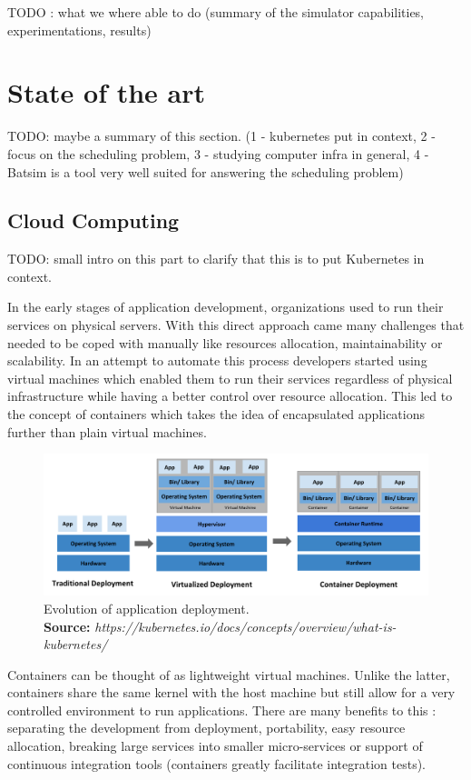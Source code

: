 \documentclass[12pt, a4paper]{memoir}
\newcommand*{\captionsource}[2]{%
    \caption[{#1}]{%
        #1%
        \\\hspace{\linewidth}%
	\textbf{Source:} \textit{#2}%
    }%
}
\begin{document}
TODO : what we where able to do (summary of the simulator capabilities,
experimentations, results)

\chapter{State of the art}

TODO: maybe a summary of this section. (1 - kubernetes put in context, 2 -
focus on the scheduling problem, 3 - studying computer infra in general, 4 -
Batsim is a tool very well suited for answering the scheduling problem)

\section{Cloud Computing}

TODO: small intro on this part to clarify that this is to put Kubernetes in context.

In the early stages of application development, organizations used to run their
services on physical servers. With this direct approach came many challenges
that needed to be coped with manually like resources allocation,
maintainability or scalability. In an attempt to automate this process
developers started using virtual machines which enabled them to run their
services regardless of physical infrastructure while having a better control
over resource allocation.  This led to the concept of containers which takes
the idea of encapsulated applications further than plain virtual machines.

\begin{figure}[h]
	\centering
	\includegraphics[width=\textwidth]{./imgs/container_evolution.png}
	\captionsource{Evolution of application deployment.}{https://kubernetes.io/docs/concepts/overview/what-is-kubernetes/}
	\label{fig:container-evolution}
\end{figure}

Containers can be thought of as lightweight virtual machines. Unlike the
latter, containers share the same kernel with the host machine but still allow
for a very controlled environment to run applications. There are many
benefits to this : separating the development from deployment, portability,
easy resource allocation, breaking large services into smaller micro-services
or support of continuous integration tools (containers greatly facilitate
integration tests).\\
\end{document}
